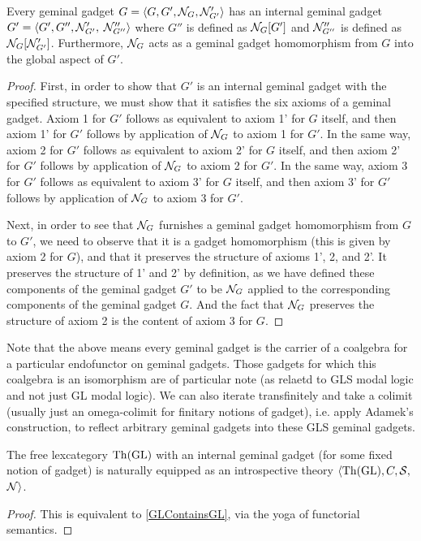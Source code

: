 \begin{theorem}\label{GLContainsGL}
Every geminal gadget $G = \langle G, G', \mathcal{N}_{G}, \mathcal{N}'_{G'}\rangle$ has an internal geminal gadget $G' = \langle G', G'', \mathcal{N}'_{G'},$ $\mathcal{N}''_{G''}\rangle$ where $G''$ is defined as $\mathcal{N}_{G}[G']$ and $\mathcal{N}''_{G''}$ is defined as $\mathcal{N}_{G}[\mathcal{N}'_{G'}]$. Furthermore, $\mathcal{N}_{G}$ acts as a geminal gadget homomorphism from $G$ into the global aspect of $G'$.
\end{theorem}
\begin{proof}
First, in order to show that $G'$ is an internal geminal gadget with the specified structure, we must show that it satisfies the six axioms of a geminal gadget. Axiom 1 for $G'$ follows as equivalent to axiom 1' for $G$ itself, and then axiom 1' for $G'$ follows by application of $\mathcal{N}_{G}$ to axiom 1 for $G'$. In the same way, axiom 2 for $G'$ follows as equivalent to axiom 2' for $G$ itself, and then axiom 2' for $G'$ follows by application of $\mathcal{N}_{G}$ to axiom 2 for $G'$. In the same way, axiom 3 for $G'$ follows as equivalent to axiom 3' for $G$ itself, and then axiom 3' for $G'$ follows by application of $\mathcal{N}_{G}$ to axiom 3 for $G'$.

Next, in order to see that $\mathcal{N}_{G}$ furnishes a geminal gadget homomorphism from $G$ to $G'$, we need to observe that it is a gadget homomorphism (this is given by axiom 2 for $G$), and that it preserves the structure of axioms 1', 2, and 2'. It preserves the structure of 1' and 2' by definition, as we have defined these components of the geminal gadget $G'$ to be $\mathcal{N}_{G}$ applied to the corresponding components of the geminal gadget $G$. And the fact that $\mathcal{N}_{G}$ preserves the structure of axiom 2 is the content of axiom 3 for $G$.
\end{proof}

\begin{TODOblock}
Note that the above means every geminal gadget is the carrier of a coalgebra for a particular endofunctor on geminal gadgets. Those gadgets for which this coalgebra is an isomorphism are of particular note (as relaetd to GLS modal logic and not just GL modal logic). We can also iterate transfinitely and take a colimit (usually just an omega-colimit for finitary notions of gadget), i.e. apply Adamek's construction, to reflect arbitrary geminal gadgets into these GLS geminal gadgets.
\end{TODOblock}

\begin{corollary}\label{GLCatTheoryIsIntrosp}
The free lexcategory $\mathrm{Th}(\mathrm{GL})$ with an internal geminal gadget (for some fixed notion of gadget) is naturally equipped as an introspective theory $\langle \mathrm{Th}(\mathrm{GL}), C, \mathcal{S}, $ $\mathcal{N} \rangle$.
\end{corollary}
\begin{proof}
This is equivalent to \cref{GLContainsGL}, via the yoga of functorial semantics.
\end{proof}

